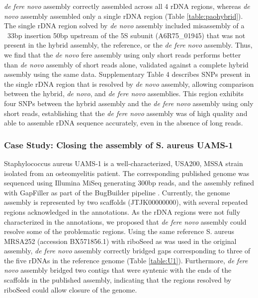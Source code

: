 \documentclass[11pt]{article}
\begin{document}
\begin{linenumbers}
\textit{de fere novo} assembly correctly assembled across all 4 rDNA regions, whereas \textit{de novo} assembly assembled only a single rDNA region (Table \ref{table:paohybrid}). The single rDNA region solved by \textit{de novo} assembly included misassembly of a ~33bp insertion 50bp upstream of the 5S subunit (A6R75\_01945) that was not present in the hybrid assembly, the reference, or the \textit{de fere novo} assembly. Thus, we find that the \textit{de novo} fere assembly using only short reads performs better than \textit{de novo} assembly of short reads alone, validated against a complete hybrid assembly using the same data. Supplementary Table 4 describes SNPs present in the single rDNA region that is resolved by \textit{de novo} assembly, allowing comparison between the hybrid, \textit{de novo}, and \textit{de fere novo} assemblies. This region exhibits four SNPs between the hybrid assembly and the \textit{de fere novo} assembly using only short reads, establishing that the \textit{de fere novo} assembly was of high quality and able to assemble rDNA sequence accurately, even in the absence of long reads.


\subsubsection*{Case Study: Closing the assembly of S. aureus UAMS-1}
Staphylococcus aureus UAMS-1 is a well-characterized, USA200, MSSA strain isolated from an osteomyelitis patient. The corresponding published genome was sequenced using Illumina MiSeq generating 300bp reads, and the assembly refined with GapFiller as part of the BugBuilder pipeline \cite{Abbott2017}. Currently, the genome assembly is represented by two scaffolds (JTJK00000000), with several repeated regions acknowledged in the annotations\cite{Sassi2015}. As the rDNA regions were not fully characterized in the annotations, we proposed that \textit{de fere novo} assembly could resolve some of the problematic regions. Using the same reference S. aureus MRSA252\cite{Holden2004} (accession BX571856.1) with riboSeed as was used in the original assembly, \textit{de fere novo} assembly correctly bridged gaps corresponding to three of the five rDNAs in the reference genome (Table \ref{table:U1}). Furthermore, \textit{de fere novo} assembly bridged two contigs that were syntenic with the ends of the scaffolds in the published assembly, indicating that the regions resolved by riboSeed could allow closure of the genome.


\end{linenumbers}
\end{document}

